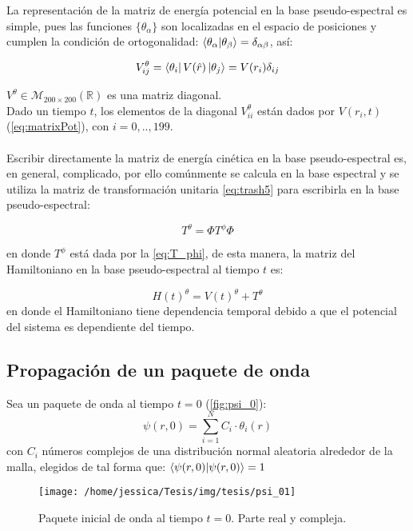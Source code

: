 La representación de la matriz de energía potencial en la base pseudo-espectral es simple, pues 
las funciones $\{\theta_{\alpha}\}$ son localizadas en el espacio de posiciones y cumplen la condición de ortogonalidad: $\bra{\theta_{\alpha}}\ket{\theta_{\beta}}= \delta_{\alpha \beta}$, así:

\begin{equation}
  \label{eq:V_DVR}
  V^{\theta}_{ij}= \bra{\theta_i}V(\hat{r})\ket{\theta_j}=V(r_i)\delta_{ij}
\end{equation}

$V^{\theta}\in \mathcal{M}_{200\times200}(\mathbb{R})$ es una matriz diagonal.
\\
Dado un tiempo $t$, los elementos de la diagonal $V^{\theta}_{ii}$ están dados por $V(r_i,t)$ (\autoref{eq:matrixPot}), con $i=0,..,199$.
\\
\\
Escribir directamente la matriz de energía cinética en la base pseudo-espectral es, en general, complicado, por ello comúnmente se calcula en la base espectral y se utiliza la matriz de transformación unitaria \autoref{eq:trash5} para escribirla en la base pseudo-espectral:

\begin{equation}
  \label{eq:trash6}
  T^{\theta} = \Phi T^{\phi} \Phi
\end{equation}

en donde $T^{\phi}$ está dada por la \autoref{eq:T_phi}, de esta manera, la matriz del Hamiltoniano en la base pseudo-espectral al tiempo $t$ es:

\begin{equation}
  \label{eq:H_DVR}
  H(t)^{\theta} = V(t)^{\theta}+T^{\theta}
\end{equation}
en donde el Hamiltoniano tiene dependencia temporal debido a que el potencial del sistema es dependiente del tiempo.

\subsection{Propagación de un paquete de onda}

Sea un paquete de onda al tiempo $t=0$ (\autoref{fig:psi_0}): 
\begin{equation}
  \label{eq:psi_0}
\psi(r,0)=\sum_{i=1}^{N}C_i \cdot \theta_{i}(r)
\end{equation}
con $C_i$ números complejos de una distribución normal aleatoria alrededor de la malla, elegidos de tal forma que: $\bra{\psi(r,0)}\ket{\psi(r,0)}=1$
\begin{figure}[!htbp]
  \centering
  \texttt{[image: /home/jessica/Tesis/img/tesis/psi\_01]}
  \caption{Paquete inicial de onda al tiempo $t=0$. Parte real y compleja.}
  \label{fig:psi_0}
\end{figure}

